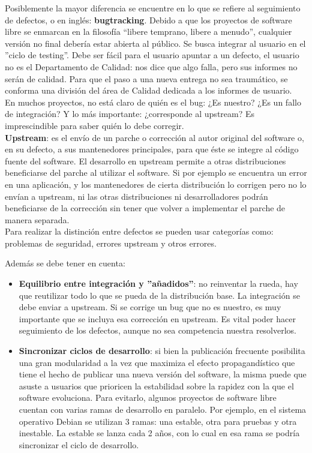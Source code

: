 Posiblemente la mayor diferencia se encuentre en lo que se refiere al seguimiento de defectos, o en inglés: \textbf{bugtracking}. Debido a que los proyectos de software libre se enmarcan en la filosofía  “libere temprano, libere a menudo”, cualquier versión no ­final debería estar abierta al público. Se busca integrar al usuario en el ''ciclo de testing''. Debe ser fácil para el usuario apuntar a un defecto, el usuario no es el Departamento de Calidad: nos dice que algo falla, pero sus informes no serán de calidad. Para que el paso a una nueva entrega no sea traumático, se conforma una división del área de Calidad dedicada a los informes de usuario.
\\

En muchos proyectos, no está claro de quién es el bug: ¿Es nuestro? ¿Es un fallo de integración? Y lo más importante: ¿corresponde al upstream? Es imprescindible para saber quién lo debe corregir.
\\

\textbf{Upstream}: es el envío de un parche o corrección al autor original del software o, en su defecto, a sus mantenedores principales, para que éste se integre al código fuente del software. El desarrollo en upstream permite a otras distribuciones beneficiarse del parche al utilizar el software. Si por ejemplo se encuentra un error en una aplicación, y los mantenedores de cierta distribución lo corrigen pero no lo envían a upstream, ni las otras distribuciones ni desarrolladores podrán beneficiarse de la corrección sin tener que volver a implementar el parche de manera separada.
\\

Para realizar la distinción entre defectos se pueden usar categorías como: problemas de seguridad, errores upstream y otros errores.

Además se debe tener en cuenta:
\begin{itemize}
     \item\textbf{Equilibrio entre integración y ''añadidos''}: no reinventar la rueda, hay que reutilizar todo lo que se pueda de la distribución base. La integración se debe enviar a upstream. Si se corrige un bug que no es nuestro, es muy importante que se incluya esa corrección en upstream. Es vital poder hacer seguimiento de los defectos, aunque no sea competencia nuestra resolverlos.
     \item\textbf{Sincronizar ciclos de desarrollo}: si bien la publicación frecuente posibilita una gran modularidad a la vez que maximiza el efecto propagandístico que tiene el hecho de publicar una nueva versión del software, la misma puede que asuste a usuarios que prioricen la estabilidad sobre la rapidez con la que el software evoluciona. Para evitarlo, algunos proyectos de software libre cuentan con varias ramas de desarrollo en paralelo. Por ejemplo, en el sistema operativo Debian se utilizan 3 ramas: una estable, otra para pruebas y otra inestable. La estable se lanza cada 2 años, con lo cual en esa rama se podría sincronizar el ciclo de desarrollo.
\end{itemize}